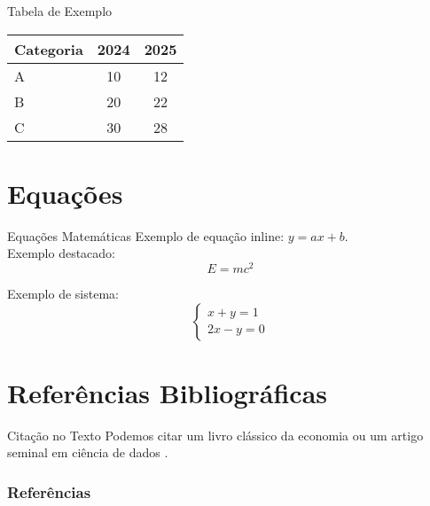\begin{frame}{Tabela de Exemplo}
    \centering
    \begin{tabular}{l|c|c}
        \textbf{Categoria} & \textbf{2024} & \textbf{2025} \\
        \hline
        A & 10 & 12 \\
        B & 20 & 22 \\
        C & 30 & 28 \\
    \end{tabular}
\end{frame}

\section{Equações}

\begin{frame}{Equações Matemáticas}
    Exemplo de equação inline: $y = ax + b$. \\[1em]

    Exemplo destacado:
    \[
        E = mc^2
    \]

    Exemplo de sistema:
    \[
        \begin{cases}
            x + y = 1 \\
            2x - y = 0
        \end{cases}
    \]
\end{frame}

\section{Referências Bibliográficas}

\begin{frame}{Citação no Texto}
    Podemos citar um livro clássico da economia \parencite{smith1776} 
    ou um artigo seminal em ciência de dados \parencite{breiman2001statistical}. 
\end{frame}

\begin{frame}[allowframebreaks]
    \frametitle{Referências}
    \printbibliography
\end{frame}
